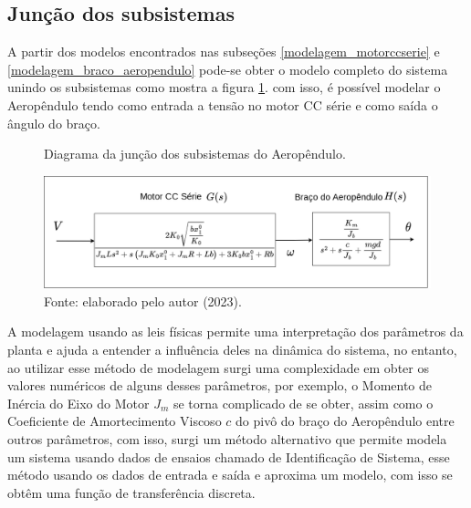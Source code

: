 \vspace{1cm}



\subsection{Junção dos subsistemas}
\label{junca0_submodelos}

A partir dos modelos encontrados nas subseções \ref{modelagem_motorccserie} e \ref{modelagem_braco_aeropendulo} pode-se obter o modelo completo do sistema unindo os subsistemas como mostra a figura \ref{fig4:image_05}. com isso, é possível modelar o Aeropêndulo tendo como entrada a tensão no motor CC série e como saída o ângulo do braço.

\begin{figure}[!h]
	\centering
	\caption{Diagrama da junção dos subsistemas do  Aeropêndulo.}
            \includegraphics[width=1\textwidth, page=1]{Capitulos/2_aeropendulo/4_figuras/ft_subsistemas.png}
	\caption*{Fonte: elaborado pelo autor (2023).}
        \label{fig4:image_05}
\end{figure}



A modelagem usando as leis físicas permite uma interpretação dos parâmetros da planta e ajuda a entender a influência deles na dinâmica do sistema, no entanto, ao utilizar esse método de modelagem surgi uma complexidade em obter os valores numéricos de alguns desses parâmetros, por exemplo, o Momento de Inércia do Eixo do Motor $J_m$ se torna complicado de se obter, assim como o Coeficiente de Amortecimento Viscoso $c$ do pivô do braço do Aeropêndulo entre outros parâmetros, com isso, surgi um método alternativo que permite modela um sistema usando dados de ensaios chamado de Identificação de Sistema, esse método usando os dados de entrada e saída e aproxima um modelo, com isso se obtêm uma função de transferência discreta.











